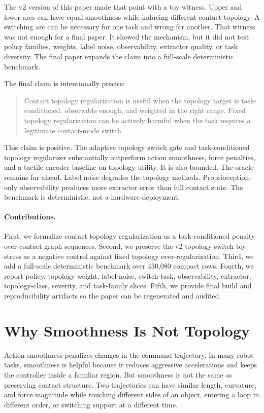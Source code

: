 \documentclass{article}
\begin{document}
The v2 version of this paper made that point with a toy witness. Upper and lower arcs can have equal smoothness while inducing different contact topology. A switching arc can be necessary for one task and wrong for another. That witness was not enough for a final paper. It showed the mechanism, but it did not test policy families, weights, label noise, observability, extractor quality, or task diversity. The final paper expands the claim into a full-scale deterministic benchmark.

The final claim is intentionally precise:
\begin{quote}
Contact topology regularization is useful when the topology target is task-conditioned, observable enough, and weighted in the right range. Fixed topology regularization can be actively harmful when the task requires a legitimate contact-mode switch.
\end{quote}

This claim is positive. The adaptive topology switch gate and task-conditioned topology regularizer substantially outperform action smoothness, force penalties, and a tactile encoder baseline on topology utility. It is also bounded. The oracle remains far ahead. Label noise degrades the topology methods. Proprioception-only observability produces more extractor error than full contact state. The benchmark is deterministic, not a hardware deployment.

\paragraph{Contributions.}
First, we formalize contact topology regularization as a task-conditioned penalty over contact graph sequences. Second, we preserve the v2 topology-switch toy stress as a negative control against fixed topology over-regularization. Third, we add a full-scale deterministic benchmark over 430,080 compact rows. Fourth, we report policy, topology-weight, label-noise, switch-task, observability, extractor, topology-class, severity, and task-family slices. Fifth, we provide final build and reproducibility artifacts so the paper can be regenerated and audited.

\section{Why Smoothness Is Not Topology}

Action smoothness penalizes changes in the command trajectory. In many robot tasks, smoothness is helpful because it reduces aggressive accelerations and keeps the controller inside a familiar region. But smoothness is not the same as preserving contact structure. Two trajectories can have similar length, curvature, and force magnitude while touching different sides of an object, entering a loop in different order, or switching support at a different time.
\end{document}
